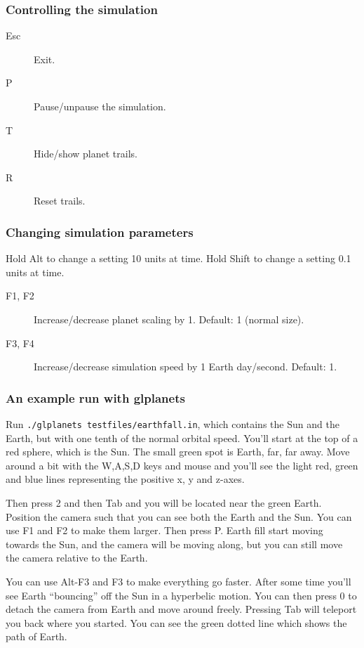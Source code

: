 \documentclass[a4paper]{article}
\begin{document}
   \subsubsection{Controlling the simulation}
   \begin{description}
   \item[Esc] Exit.
   \item[P] Pause/unpause the simulation.
   \item[T] Hide/show planet trails.
   \item[R] Reset trails.
   \end{description}
   \subsubsection{Changing simulation parameters}
   Hold Alt to change a setting 10 units at time. Hold Shift to change a setting 0.1 units at time.
   \begin{description}
   \item[F1, F2] Increase/decrease planet scaling by 1. Default: 1 (normal size).
   \item[F3, F4] Increase/decrease simulation speed by 1 Earth day/second. Default: 1.
   \end{description}
   \subsubsection{An example run with glplanets}
   Run \texttt{./glplanets testfiles/earthfall.in}, which contains the Sun and the Earth, but with one tenth of the normal orbital speed.
   You'll start at the top of a red sphere, which is the Sun.
   The small green spot is Earth, far, far away.
   Move around a bit with the W,A,S,D keys and mouse and you'll see the light red, green and blue lines representing the positive x, y and z-axes.

   Then press 2 and then Tab and you will be located near the green Earth.
   Position the camera such that you can see both the Earth and the Sun.
   You can use F1 and F2 to make them larger.
   Then press P. Earth fill start moving towards the Sun, and the camera will be moving along, but you can still move the camera relative to the Earth.

   You can use Alt-F3 and F3 to make everything go faster.
   After some time you'll see Earth ``bouncing'' off the Sun in a hyperbelic motion.
   You can then press 0 to detach the camera from Earth and move around freely.
   Pressing Tab will teleport you back where you started.
   You can see the green dotted line which shows the path of Earth.
\end{document}
